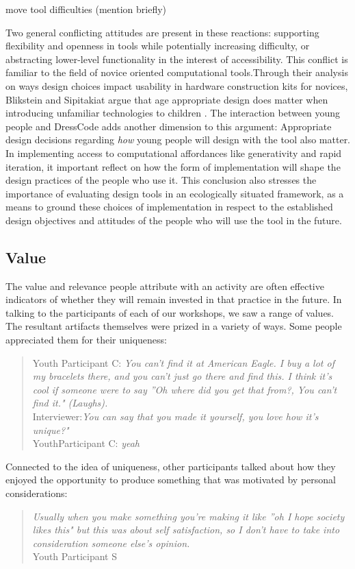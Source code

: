 \documentclass{sigchi}
\begin{document}
move tool difficulties (mention briefly)

Two general conflicting attitudes are present in these reactions: supporting flexibility and openness in tools while potentially increasing difficulty, or abstracting lower-level functionality in the interest of accessibility. This conflict is familiar to the field of novice oriented computational tools.Through their analysis on ways design choices impact usability in hardware construction kits for novices, Blikstein and Sipitakiat argue that age appropriate design does matter when introducing unfamiliar technologies to children \cite{blik}. The interaction between young people and DressCode adds another dimension to this argument: Appropriate design decisions regarding \textit{how} young people will design with the tool also matter. In implementing access to computational affordances like generativity and rapid iteration, it important reflect on how the form of implementation will shape the design practices of the people who use it. This conclusion also stresses the importance of evaluating design tools in an ecologically situated framework, as a means to ground these choices of implementation in respect to the established design objectives and attitudes of the people who will use the tool in the future.

\subsection{Value}
The value and relevance people attribute with an activity are often effective indicators of whether they will remain invested in that practice in the future. In talking to the participants of each of our workshops, we saw a range of values. The resultant artifacts themselves were prized in a variety of ways. Some people appreciated them for their uniqueness:
\begin{quotation}
Youth Participant C: \textit{You can't find it at American Eagle. I buy a lot of my bracelets there, and you can't just go there and find this. I think it's cool if someone were to say ''Oh where did you get that from?, You can't find it." (Laughs).}
\\Interviewer:\textit{You can say that you made it yourself, you love how it's unique?"}
\\YouthParticipant C: \textit{yeah}
\end{quotation}

Connected to the idea of uniqueness, other participants talked about how they enjoyed the opportunity to produce something that was motivated by personal considerations:
\begin{quotation}
\textit{Usually when you make something you're making it like ''oh I hope society likes this" but this was about self satisfaction, so I don't have to take into consideration someone else's opinion.}
\\Youth Participant S
\end{quotation}
\end{document}
